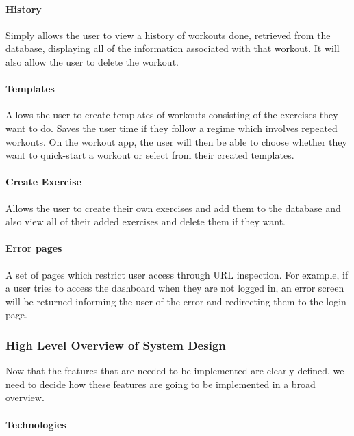 \documentclass{article}
\begin{document}
\paragraph{History}

Simply allows the user to view a history of workouts done, retrieved from the database, displaying all of the information associated with that workout. It will also allow the user to delete the workout.

\paragraph{Templates}

Allows the user to create templates of workouts consisting of the exercises they want to do. Saves the user time if they follow a regime which involves repeated workouts. On the workout app, the user will then be able to choose whether they want to quick-start a workout or select from their created templates. 

\paragraph{Create Exercise}

Allows the user to create their own exercises and add them to the database and also view all of their added exercises and delete them if they want. 

\paragraph{Error pages}

A set of pages which restrict user access through URL inspection. For example, if a user tries to access the dashboard when they are not logged in, an error screen will be returned informing the user of the error and redirecting them to the login page. 

\subsubsection{High Level Overview of System Design}

Now that the features that are needed to be implemented are clearly defined, we need to decide how these features are going to be implemented in a broad overview. 

\paragraph{Technologies}
\end{document}
